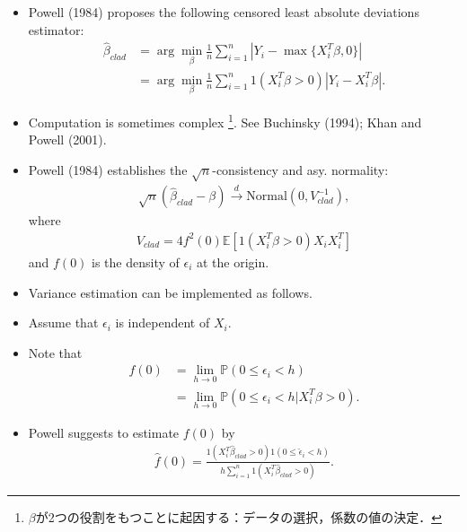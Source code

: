 \documentclass[xcolor=svgnames,dvipdfmx,cjk]{beamer}
\theoremstyle{example}
\def\E{\mathbb{E}}
\def\P{\mathbb{P}}
\def\darrow{\xrightarrow{d}}
\begin{document}
\begin{frame}
      \begin{itemize}
            \item Powell (1984) proposes the following 
                  \alert{censored least absolute deviations estimator}:
                  \begin{align*}
                        \hat{\beta}_{clad} 
                              &= \arg\min_{\beta} \frac{1}{n} \sum_{i=1}^n |Y_i - \max\{X_i^T\beta , 0\}| \\
                              &= \arg\min_{\beta} \frac{1}{n} \sum_{i=1}^n 1(X_i^T\beta > 0)|Y_i - X_i^T \beta|.
                  \end{align*}
            \item Computation is sometimes complex
                  \footnote{$\beta$が2つの役割をもつことに起因する：データの選択，係数の値の決定．}.
                  See Buchinsky (1994); Khan and Powell (2001).
            \item Powell (1984) establishes the $\sqrt{n}$-consistency and asy. normality:
                  \begin{align*}
                        \sqrt{n} (\hat{\beta}_{clad} - \beta) \darrow \text{Normal} (0, V_{clad}^{-1}),
                  \end{align*}
                  where 
                  \begin{align*}
                        V_{clad} = 4 f^{2}(0) \E[1(X_i^T\beta >0) X_i X_i^T ]
                  \end{align*}
                  and $f(0)$ is the density of $\epsilon_i$ at the origin.
      \end{itemize}
\end{frame}

\begin{frame}
      \begin{itemize}
            \item Variance estimation can be implemented as follows.
            \item Assume that $\epsilon_i$ is independent of $X_i$.
            \item Note that 
                  \begin{align*}
                        f(0) &= \lim_{h \to 0} \P(0 \leq \epsilon_i < h) \\
                             &= \lim_{h \to 0} \P(0 \leq \epsilon_i < h | X_i^T\beta>0).
                  \end{align*}
            \item Powell suggests to estimate $f(0)$ by
                  \begin{align*}
                        \hat{f}(0) = \frac{
                              1(X_i^T \hat{\beta}_{clad} > 0) 1(0 \leq \hat{\epsilon}_i < h)
                        }{
                              h \sum_{i=1}^n 1(X_i^T \hat{\beta}_{clad} > 0)
                        }.
                  \end{align*}
      \end{itemize}
\end{frame}
\end{document}

